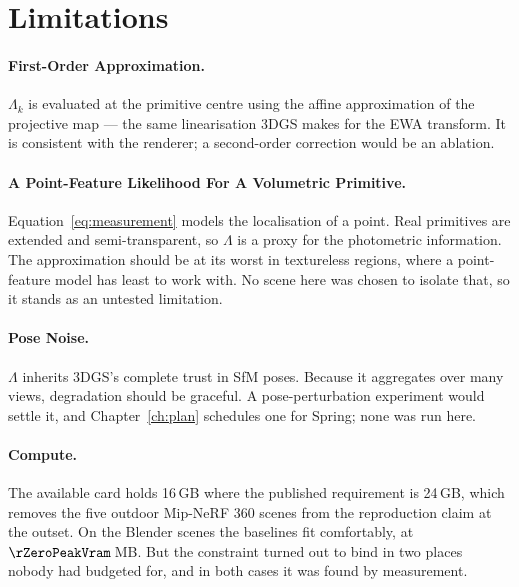 
\section{Limitations}

\paragraph{First-Order Approximation.} $\Lambda_k$ is evaluated at the primitive
centre using the affine approximation of the projective map --- the same
linearisation 3DGS makes for the EWA transform. It is consistent with the
renderer; a second-order correction would be an ablation.

\paragraph{A Point-Feature Likelihood For A Volumetric Primitive.}
Equation~\eqref{eq:measurement} models the localisation of a point. Real primitives are extended and semi-transparent, so $\Lambda$ is a proxy for
the photometric information. The approximation should be at its worst in
textureless regions, where a point-feature model has least to work with. No
scene here was chosen to isolate that, so it stands as an untested limitation.

\paragraph{Pose Noise.} $\Lambda$ inherits 3DGS's complete trust in SfM poses.
Because it aggregates over many views, degradation should be graceful. A
pose-perturbation experiment would settle it, and Chapter~\ref{ch:plan}
schedules one for Spring; none was run here.

\paragraph{Compute.} The available card holds 16\,GB where the published
requirement is 24\,GB, which removes the five outdoor Mip-NeRF 360 scenes from
the reproduction claim at the outset. On the Blender scenes the baselines fit
comfortably, at $\rZeroPeakVram$\,MB. But the constraint turned out to bind in
two places nobody had budgeted for, and in both cases it was found by measurement.

